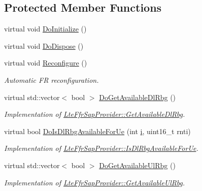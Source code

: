 \subsection*{Protected Member Functions}
\begin{DoxyCompactItemize}
\item 
virtual void \hyperlink{classns3_1_1LteFfrSimple_a98fb8e8c8d13a8a90f35b2a5a9213c4d}{Do\+Initialize} ()
\item 
virtual void \hyperlink{classns3_1_1LteFfrSimple_a253f53987ae5372b5285315570d010f3}{Do\+Dispose} ()
\item 
virtual void \hyperlink{classns3_1_1LteFfrSimple_acc3471afb9bba1dba4024caadfe17633}{Reconfigure} ()
\begin{DoxyCompactList}\small\item\em Automatic FR reconfiguration. \end{DoxyCompactList}\item 
virtual std\+::vector$<$ bool $>$ \hyperlink{classns3_1_1LteFfrSimple_a45da9d2aad68697a3299eb32d8ea5559}{Do\+Get\+Available\+Dl\+Rbg} ()
\begin{DoxyCompactList}\small\item\em Implementation of \hyperlink{classns3_1_1LteFfrSapProvider_ad60306dae43b74dc25b65f81d6587a24}{Lte\+Ffr\+Sap\+Provider\+::\+Get\+Available\+Dl\+Rbg}. \end{DoxyCompactList}\item 
virtual bool \hyperlink{classns3_1_1LteFfrSimple_a21993c2069e70a033e49624e916d3694}{Do\+Is\+Dl\+Rbg\+Available\+For\+Ue} (int \hyperlink{lte__uplink__power__control_8m_a6f6ccfcf58b31cb6412107d9d5281426}{i}, uint16\+\_\+t rnti)
\begin{DoxyCompactList}\small\item\em Implementation of \hyperlink{classns3_1_1LteFfrSapProvider_a91f4de3c794d2a32fae5bcfafd88b6fa}{Lte\+Ffr\+Sap\+Provider\+::\+Is\+Dl\+Rbg\+Available\+For\+Ue}. \end{DoxyCompactList}\item 
virtual std\+::vector$<$ bool $>$ \hyperlink{classns3_1_1LteFfrSimple_a25f66ef964d289e41058e61f10c2e439}{Do\+Get\+Available\+Ul\+Rbg} ()
\begin{DoxyCompactList}\small\item\em Implementation of \hyperlink{classns3_1_1LteFfrSapProvider_aafd23b22a27ec83e03d54795c122d175}{Lte\+Ffr\+Sap\+Provider\+::\+Get\+Available\+Ul\+Rbg}. \end{DoxyCompactList}\item 

\end{DoxyCompactItemize}

